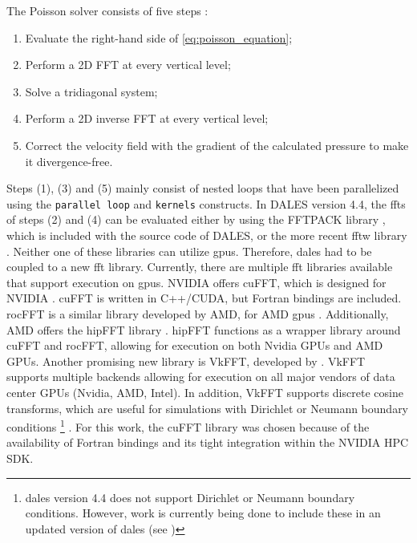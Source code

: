 The Poisson solver consists of five steps :

\begin{enumerate}
  \item Evaluate the right-hand side of \autoref{eq:poisson_equation};
  \item Perform a 2D FFT at every vertical level;
  \item Solve a tridiagonal system;
  \item Perform a 2D inverse FFT at every vertical level;
  \item Correct the velocity field with the gradient of the calculated pressure to make it divergence-free.
\end{enumerate}

Steps (1), (3) and (5) mainly consist of nested loops that have been parallelized using the \texttt{parallel loop} and \texttt{kernels} constructs. In DALES version 4.4, the \acrshort{fft}s of steps (2) and (4) can be evaluated either by using the FFTPACK library \citep{swarztrauberVectorizingFFTs1982}, which is included with the source code of DALES, or the more recent \acrfull{fftw} library \citep{frigoFFTWAdaptiveSoftware1998a}. Neither one of these libraries can utilize \acrshort{gpu}s. Therefore, \acrshort{dales} had to be coupled to a new \acrshort{fft} library. Currently, there are multiple \acrshort{fft} libraries available that support execution on \acrshort{gpu}s. NVIDIA offers cuFFT, which is designed for NVIDIA  \citep{nvidiaCuFFT}. cuFFT is written in C++/CUDA, but Fortran bindings are included. rocFFT is a similar library developed by AMD, for AMD \acrshort{gpu}s \citep{amdRocFFT2023}. Additionally, AMD offers the hipFFT library \citep{amdHipFFT2023}. hipFFT functions as a wrapper library around cuFFT and rocFFT, allowing for execution on both Nvidia GPUs and AMD GPUs. Another promising new library is VkFFT, developed by \citet{tolmachevVkFFTAPerformantCrossPlatform2023}. VkFFT supports multiple backends allowing for execution on all major vendors of data center GPUs (Nvidia, AMD, Intel). In addition, VkFFT supports discrete cosine transforms, which are useful for simulations with Dirichlet or Neumann boundary conditions \footnote{\acrshort{dales} version 4.4 does not support Dirichlet or Neumann boundary conditions. However, work is currently being done to include these in an updated version of \acrshort{dales} (see \citet{liquilungOpenBoundaryConditions2023})} \citep{schumannFastFourierTransforms1988}. For this work, the cuFFT library was chosen because of the availability of Fortran bindings and its tight integration within the NVIDIA HPC SDK.

